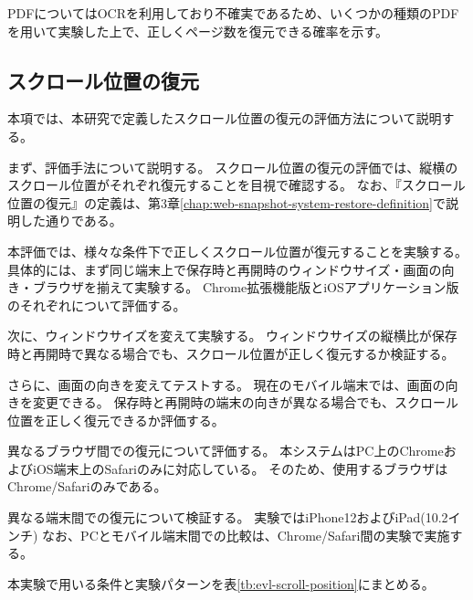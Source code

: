 PDFについてはOCRを利用しており不確実であるため、いくつかの種類のPDFを用いて実験した上で、正しくページ数を復元できる確率を示す。

\subsection{スクロール位置の復元}
本項では、本研究で定義したスクロール位置の復元の評価方法について説明する。

まず、評価手法について説明する。
スクロール位置の復元の評価では、縦横のスクロール位置がそれぞれ復元することを目視で確認する。
なお、『スクロール位置の復元』の定義は、第3章\ref{chap:web-snapshot-system-restore-definition}で説明した通りである。

本評価では、様々な条件下で正しくスクロール位置が復元することを実験する。
具体的には、まず同じ端末上で保存時と再開時のウィンドウサイズ・画面の向き・ブラウザを揃えて実験する。
Chrome拡張機能版とiOSアプリケーション版のそれぞれについて評価する。

次に、ウィンドウサイズを変えて実験する。
ウィンドウサイズの縦横比が保存時と再開時で異なる場合でも、スクロール位置が正しく復元するか検証する。

さらに、画面の向きを変えてテストする。
現在のモバイル端末では、画面の向きを変更できる。
保存時と再開時の端末の向きが異なる場合でも、スクロール位置を正しく復元できるか評価する。

異なるブラウザ間での復元について評価する。
本システムはPC上のChromeおよびiOS端末上のSafariのみに対応している。
そのため、使用するブラウザはChrome/Safariのみである。

異なる端末間での復元について検証する。
実験ではiPhone12\cite{iphone12}およびiPad(10.2インチ)\cite{ipad}
なお、PCとモバイル端末間での比較は、Chrome/Safari間の実験で実施する。

本実験で用いる条件と実験パターンを表\ref{tb:evl-scroll-position}にまとめる。

